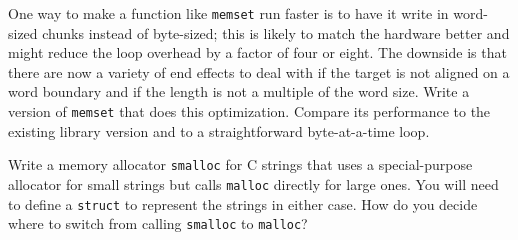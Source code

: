 \begin{exercise}
    One way to make a function like \verb'memset' run faster is to have it
    write in word-sized chunks instead of byte-sized; this is likely to
    match the hardware better and might reduce the loop overhead by a
    factor of four or eight. The downside is that there are now a variety
    of end effects to deal with if the target is not aligned on a word
    boundary and if the length is not a multiple of the word size. Write a
    version of \verb'memset' that does this optimization. Compare its
    performance to the existing library version and to a straightforward
    byte-at-a-time loop.
\end{exercise}

\begin{exercise}
    Write a memory allocator \verb'smalloc' for C strings that uses a
    special-purpose allocator for small strings but calls \verb'malloc'
    directly for large ones. You will need to define a \verb'struct' to
    represent the strings in either case.  How do you decide where to
    switch from calling \verb'smalloc' to \verb'malloc'?
\end{exercise}
